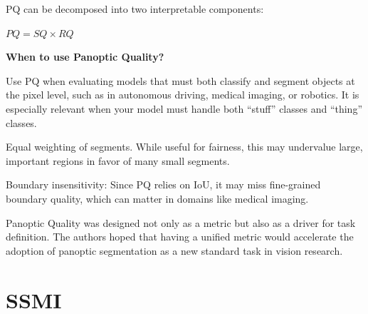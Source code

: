 PQ can be decomposed into two interpretable components:

\begin{center}
    $PQ = SQ \times RQ$
\end{center}

\textbf{When to use Panoptic Quality?}

Use PQ when evaluating models that must both classify and segment objects at the pixel level, such
as in autonomous driving, medical imaging, or robotics. It is especially relevant when your model
must handle both “stuff” classes and “thing” classes.


{
\item Equal weighting of segments. While useful for fairness, this may undervalue large, important regions in favor of many small segments.
\item Boundary insensitivity: Since PQ relies on IoU, it may miss fine-grained boundary quality,
which can matter in domains like medical imaging.
}

\clearpage

\thispagestyle{customstyle}

{Panoptic Quality was designed not only as a metric but also as a driver for task definition. The authors
hoped that having a unified metric would accelerate the adoption of panoptic segmentation as a new standard
task in vision research.}



\clearpage
\thispagestyle{cvstyle}
\section{SSMI}
